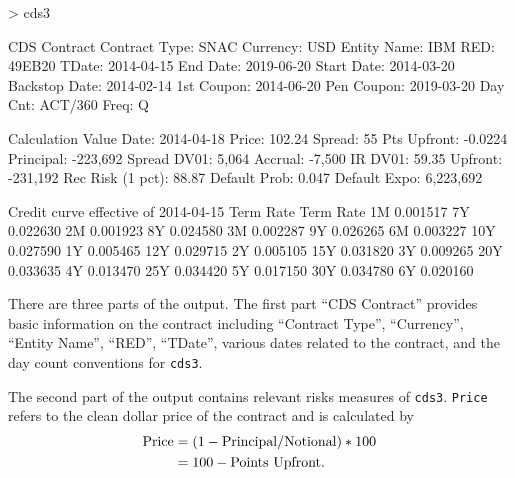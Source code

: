 \documentclass[a4paper]{article}
\renewenvironment{Schunk}{\vspace{\topsep}}{\vspace{\topsep}}
\begin{document}
\begin{Schunk}
\begin{Sinput}
> cds3
\end{Sinput}
\begin{Soutput}
CDS Contract 
Contract Type:                      SNAC   Currency:                         USD
Entity Name:                         IBM   RED:                           49EB20
TDate:                        2014-04-15   End Date:                  2019-06-20
Start Date:                   2014-03-20   Backstop Date:             2014-02-14
1st Coupon:                   2014-06-20   Pen Coupon:                2019-03-20
Day Cnt:                         ACT/360   Freq:                               Q

Calculation 
Value Date:                   2014-04-18   Price:                         102.24
Spread:                               55   Pts Upfront:                  -0.0224
Principal:                      -223,692   Spread DV01:                    5,064
Accrual:                          -7,500   IR DV01:                        59.35
Upfront:                        -231,192   Rec Risk (1 pct):               88.87
Default Prob:                      0.047   Default Expo:               6,223,692

Credit curve effective of 2014-04-15 
 Term     Rate Term     Rate
   1M 0.001517   7Y 0.022630
   2M 0.001923   8Y 0.024580
   3M 0.002287   9Y 0.026265
   6M 0.003227  10Y 0.027590
   1Y 0.005465  12Y 0.029715
   2Y 0.005105  15Y 0.031820
   3Y 0.009265  20Y 0.033635
   4Y 0.013470  25Y 0.034420
   5Y 0.017150  30Y 0.034780
   6Y 0.020160              
\end{Soutput}
\end{Schunk}

There are three parts of the output. The first part ``CDS Contract''
provides basic information on the contract including ``Contract
Type'', ``Currency'', ``Entity Name'', ``RED'', ``TDate'', various
dates related to the contract, and the day count conventions for
\texttt{cds3}. 

The second part of the output contains relevant risks measures of
\texttt{cds3}. \texttt{Price} refers to the clean dollar price of the
contract and is calculated by
\begin{equation}
  \begin{aligned}
    {\rm Price} & =  (1 - {\rm Principal} / {\rm Notional})*100  \nonumber \\
    & =  100 - \text{Points Upfront}. \nonumber
  \end{aligned}
\end{equation}
\end{document}
